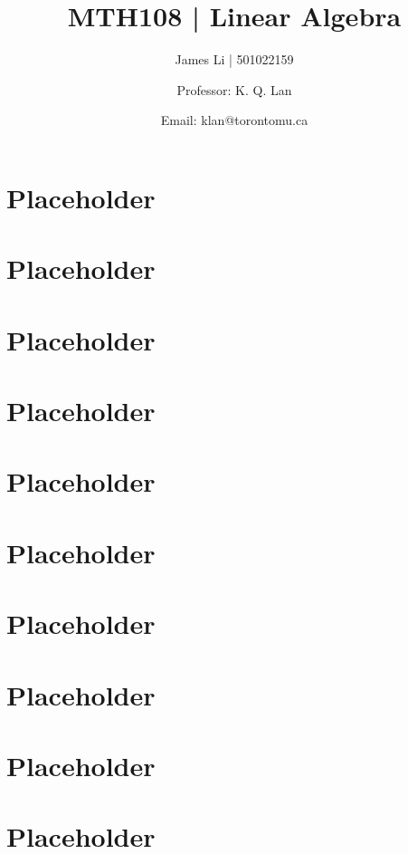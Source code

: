 \documentclass[a4paper]{article}
\title{MTH108 | Linear Algebra}
\author{James Li | 501022159 \and Professor: K. Q. Lan\and Email: klan@torontomu.ca}
\date{}
\begin{document}
  \maketitle
  \tableofcontents
  \newpage
  \section{Placeholder} 
  \section{Placeholder} 
  \section{Placeholder} 
  \section{Placeholder} 
  \section{Placeholder} 
  \section{Placeholder} 
  \section{Placeholder} 
  \section{Placeholder} 
  \section{Placeholder} 
  \section{Placeholder} 
\end{document}
